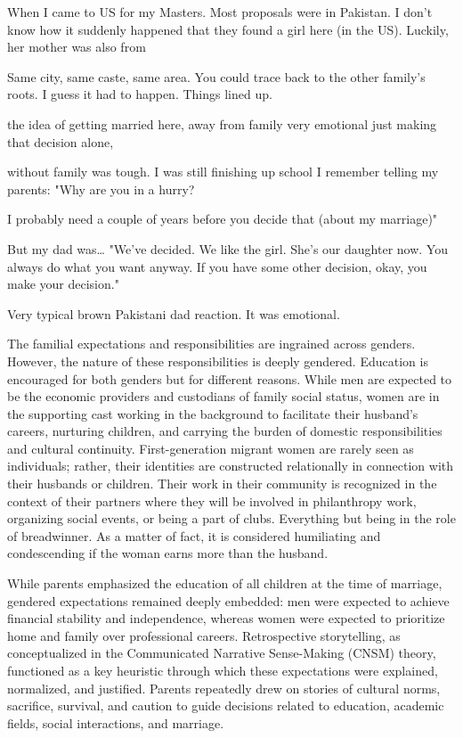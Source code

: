 \begin{FoundPoem}
When I came to US for my Masters.
Most proposals were in Pakistan.
I don’t know how it suddenly happened
that they found a girl here (in the US).
Luckily, her mother was also from

 Same city, same caste, same area.
You could trace back to the other family’s roots.
I guess it had to happen.
Things lined up.

the idea of getting married here,
away from family
 	very emotional
just making that decision alone, 

without family 
was tough.
I was still finishing up school
I remember telling my parents:
                      "Why are you in a hurry?

I probably need a couple of years
before you decide that (about my marriage)"

But my dad was…
"We’ve decided.
We like the girl.
She’s our daughter now.
You always do what you want anyway.
If you have some other decision, okay,
you make your decision."

Very typical brown Pakistani dad reaction.
It was emotional.
\end{FoundPoem}

The familial expectations and responsibilities are ingrained across genders. However, the nature of these responsibilities is deeply gendered. Education is encouraged for both genders but for different reasons. While men are expected to be the economic providers and custodians of family social status, women are in the supporting cast working in the background to facilitate their husband’s careers, nurturing children, and carrying the burden of domestic responsibilities and cultural continuity. First-generation migrant women are rarely seen as individuals; rather, their identities are constructed relationally in connection with their husbands or children. Their work in their community is recognized in the context of their partners where they will be involved in philanthropy work, organizing social events, or being a part of clubs. Everything but being in the role of breadwinner. As a matter of fact, it is considered humiliating and condescending if the woman earns more than the husband.

 While parents emphasized the education of all children at the time of marriage, gendered expectations remained deeply embedded: men were expected to achieve financial stability and independence, whereas women were expected to prioritize home and family over professional careers. Retrospective storytelling, as conceptualized in the Communicated Narrative Sense-Making (CNSM) theory, functioned as a key heuristic through which these expectations were explained, normalized, and justified. Parents repeatedly drew on stories of cultural norms, sacrifice, survival, and caution to guide decisions related to education, academic fields, social interactions, and marriage.
 
